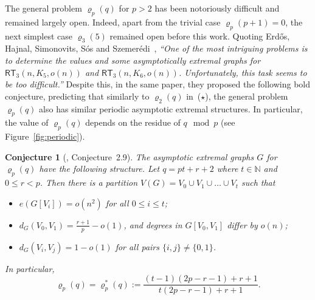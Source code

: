 \documentclass[10pt,a4paper]{article}
\def\pseudop{{\star}}
\newtheorem{conjx}{Conjecture}
\theoremstyle{definition}
\newcommand{\rt}{{\mathsf{RT}}}
\begin{document}
The general problem $\varrho_p(q)$ for $p>2$ has been notoriously difficult and remained largely open. Indeed, apart from the trivial case $\varrho_p(p+1)=0$, the next simplest case $\varrho_3(5)$ remained open before this work. Quoting Erd\H{o}s, Hajnal, Simonovits, S\'os and Szemer\'edi~\cite{EHSSSz}, \emph{``One of the most intriguing problems is to determine the values and some asymptotically extremal graphs for $\rt_3(n,K_5,o(n))$ and $\rt_3(n,K_6,o(n))$. Unfortunately, this task seems to be too difficult.''} Despite this, in the same paper, they proposed the following bold conjecture, predicting that similarly to $\varrho_2(q)$ in~($\pseudop$), the general problem $\varrho_p(q)$ also has similar periodic asymptotic extremal structures. In particular, the value of $\varrho_p(q)$ depends on the residue of $q\!\mod p$ (see Figure~\ref{fig:periodic}).%

\begin{conjx}[\cite{EHSSSz}, Conjecture~2.9]\label{conj}
	The asymptotic extremal graphs $G$ for $\varrho_p(q)$ have the following structure.
	Let $q=pt+r+2$ where $t\in\mathbb{N}$ and $0 \leq r < p$. Then there is a partition $V(G)= V_0\cup V_1 \cup \ldots \cup V_t$ such that
	\begin{itemize}
		\item $e(G[V_i])=o(n^2)$ for all $0\le i \le t$;
		
		\item $d_G(V_0,V_1) = \frac{r+1}{p}-o(1)$, and degrees in $G[V_0,V_1]$ differ by $o(n)$;
		
		\item $d_G(V_i,V_j) =1-o(1)$ for all pairs $\lbrace i,j\rbrace \neq \lbrace 0,1\rbrace$.
	\end{itemize}
	In particular, 
	\begin{equation}\label{eq:conjRTdensity}
		\varrho_p(q)=\varrho_p^*(q):=\frac{(t-1)(2p-r-1)+r+1}{t(2p-r-1)+r+1}.
	\end{equation}
\end{conjx}
\end{document}
